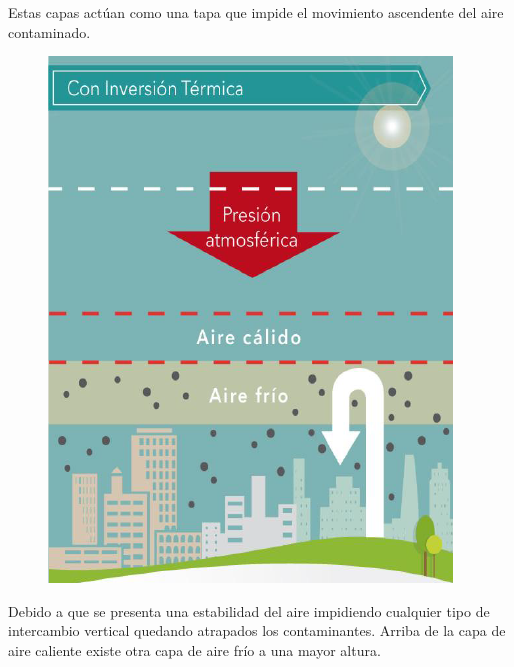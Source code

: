 \documentclass[12pt]{article}
\begin{document}
Estas capas actúan como una tapa que impide el movimiento ascendente del aire contaminado.
\begin{figure}[H]
    \centering
    \includegraphics[scale=0.5]{Imagenes/Inversion_Termica_02.png}
\end{figure}
Debido a que se presenta una estabilidad del aire impidiendo cualquier tipo de intercambio vertical quedando atrapados los contaminantes. Arriba de la capa de aire caliente existe otra capa de aire frío a una mayor altura.
\end{document}
